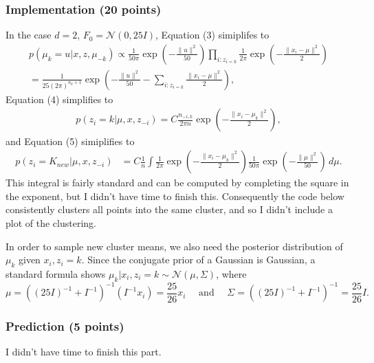 \documentclass[11pt]{article}
\newcommand{\inv}{^{-1}}
\begin{document}
\subsubsection{Implementation (20 points)}
In the case $d = 2$, $F_0 = \mathcal{N}(0, 25I)$, Equation (3) simiplifes to
\begin{align*}
p(\mu_k = u | x,z,\mu_{-k})
    \propto \frac{1}{50\pi} \exp\left( -\frac{\|u\|^2}{50} \right)
        \prod_{i : z_{i = k}} \frac{1}{2\pi}
                        \exp \left(- \frac{\|x_i - \mu\|^2}{2} \right)    \\
    = \frac{1}{25(2\pi)^{n_k + 1}} \exp\left(
        -\frac{\|u\|^2}{50} - \sum_{i : z_{i = k}} \frac{\|x_i - \mu\|^2}{2}
        \right),
\end{align*}
Equation (4) simplifies to
\begin{align*}
p(z_i = k | \mu, x, z_{-i})
    = C\frac{n_{-i,k}}{2\pi n}
        \exp\left( -\frac{\|x_i - \mu_k\|^2}{2} \right),
\end{align*}
and Equation (5) simiplifies to
\begin{align*}
p(z_i = K_{new} | \mu, x, z_{-i})
 &  = C \frac1n
        \int \frac{1}{2\pi} \exp\left( - \frac{\|x_i - \mu_k\|^2}{2} \right)
        \frac{1}{50\pi}\exp\left( -\frac{\|\mu\|^2}{50} \right) \, d\mu.
\end{align*}
This integral is fairly standard and can be computed by completing the square
in the exponent, but I didn't have time to finish this. Consequently the code
below consistently clusters all points into the same cluster, and so I didn't
include a plot of the clustering.

In order to sample new cluster means, we also need the posterior distribution
of $\mu_k$ given $x_i, z_i = k$. Since the conjugate prior of a Gaussian is
Gaussian, a standard formula shows
$\mu_k | x_i, z_i = k \sim \mathcal{N}(\mu, \Sigma)$, where
\[\mu
    = ((25I)\inv + I\inv)\inv(I\inv x_i)
    = \frac{25}{26} x_i
\quad \mbox{ and } \quad
\Sigma
    = ((25I)\inv + I\inv)\inv
    = \frac{25}{26} I.
\]

\subsubsection{Prediction (5 points)}
I didn't have time to finish this part.
\end{document}
